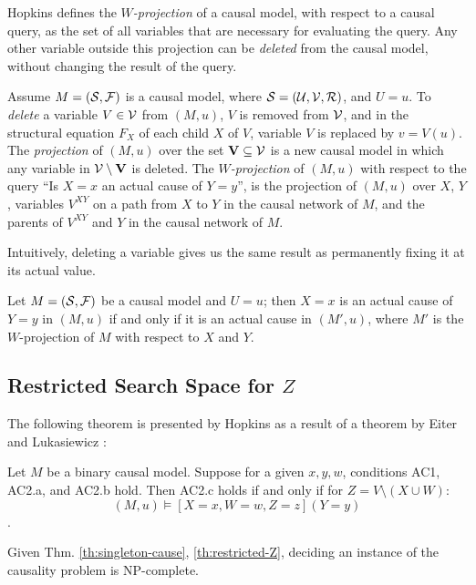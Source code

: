 Hopkins \cite{hopkins2002strategies} defines the \emph{$W$-projection}
of a causal model, with respect to a causal query, as the set of all 
variables that are necessary for evaluating the query. Any other
variable outside this projection can be \emph{deleted} from the causal
model, without changing the result of the query.

\begin{definition}\label{def:variable-deletion}
    Assume $M=(\mathcal{S}, \mathcal{F})$ is a causal model, where 
    $\mathcal{S}=(\mathcal{U}, \mathcal{V}, \mathcal{R})$, and $U=u$. To 
    \emph{delete} a variable $V \in \mathcal{V}$ from $(M,u)$, $V$ is 
    removed from $\mathcal{V}$, and in the structural equation $F_X$ of
    each child $X$ of $V$, variable $V$ is replaced by $v = V(u)$.
    The \emph{projection} of $(M, u)$ over the set
    $\mathbf{V} \subseteq \mathcal{V}$ is a new causal model in which
    any variable in $\mathcal{V} \setminus \mathbf{V}$ is deleted.
    The \emph{$W$-projection} of $(M,u)$ with respect to the query 
    ``Is $X=x$ an actual cause of $Y=y$'', is the projection of $(M,u)$
    over $X$, $Y$, variables $V^{XY}$ on a path from $X$ to $Y$ in
    the causal network of $M$, and the parents of $V^{XY}$ and $Y$ 
    in the causal network of $M$.
\end{definition}

Intuitively, deleting a variable gives us the same result as
permanently fixing it at its actual value.

\begin{theorem}
    Let $M=(\mathcal{S}, \mathcal{F})$ be a causal model and $U=u$; then
    $X=x$ is an actual cause of $Y=y$ in $(M,u)$ if and only if 
    it is an actual cause in $(M',u)$, where $M'$ is the
    $W$-projection of $M$ with respect to $X$ and $Y$.
\end{theorem}


\subsection{\texorpdfstring
    {Restricted Search Space for $Z$}
    {Restricte Search Space for \textit{Z}}
}

The following theorem is presented by Hopkins
\cite{hopkins2002strategies} as a result of a theorem by Eiter and 
Lukasiewicz \cite{eiter2001complexity}:

\begin{theorem}\label{th:restricted-Z}
    Let $M$ be a binary causal model. Suppose for a given $x,y,w$, 
    conditions AC1, AC2.a, and AC2.b hold. Then AC2.c holds if and 
    only if for $Z=V \setminus (X \cup W)$:
    $$ (M, u) \models [X=x, W=w, Z=z] (Y=y) $$. 
\end{theorem}


Given Thm. \ref{th:singleton-cause}, \ref{th:restricted-Z}, deciding 
an instance of the causality problem is NP-complete.